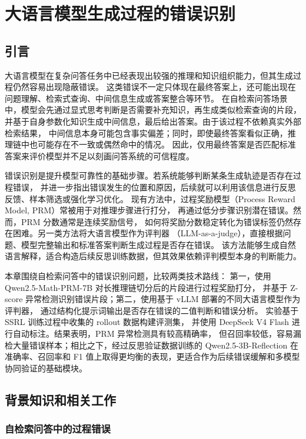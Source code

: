 
\chapter{大语言模型生成过程的错误识别}

\section{引言}

大语言模型在复杂问答任务中已经表现出较强的推理和知识组织能力，但其生成过程仍然容易出现隐蔽错误。
这类错误不一定只体现在最终答案上，还可能出现在问题理解、检索式查询、中间信息生成或答案整合等环节。
在自检索问答场景中，模型会先通过显式思考判断是否需要补充知识，再生成类似检索查询的片段，
并基于自身参数化知识生成中间信息，最后给出答案。由于该过程不依赖真实外部检索结果，
中间信息本身可能包含事实偏差；同时，即使最终答案看似正确，推理链中也可能存在不一致或偶然命中的情况。
因此，仅用最终答案是否匹配标准答案来评价模型并不足以刻画问答系统的可信程度。

错误识别是提升模型可靠性的基础步骤。若系统能够判断某条生成轨迹是否存在过程错误，
并进一步指出错误发生的位置和原因，后续就可以利用该信息进行反思反馈、样本筛选或强化学习优化。
现有方法中，过程奖励模型（Process Reward Model, PRM）常被用于对推理步骤进行打分，
再通过低分步骤识别潜在错误。然而，PRM 分数通常是连续奖励信号，
如何将奖励分数稳定转化为错误标签仍然存在困难。另一类方法将大语言模型作为评判器
（LLM-as-a-judge），直接根据问题、模型完整输出和标准答案判断生成过程是否存在错误。
该方法能够生成自然语言解释，适合构造后续反思训练数据，但其效果依赖评判模型本身的判断能力。

本章围绕自检索问答中的错误识别问题，比较两类技术路线：
第一，使用 Qwen2.5-Math-PRM-7B 对长推理链切分后的片段进行过程奖励打分，
并基于 Z-score 异常检测识别错误片段；第二，使用基于 vLLM 部署的不同大语言模型作为评判器，
通过结构化提示词输出是否存在错误的二值判断和错误分析。
实验基于 SSRL 训练过程中收集的 rollout 数据构建评测集，
并使用 DeepSeek V4 Flash 进行自动标注。结果表明，PRM 异常检测具有较高精确率，
但召回率较低，容易漏检大量错误样本；相比之下，经过反思验证数据训练的 Qwen2.5-3B-Reflection
在准确率、召回率和 F1 值上取得更均衡的表现，更适合作为后续错误缓解和多模型协同验证的基础模块。

\section{背景知识和相关工作}

\subsection{自检索问答中的过程错误}

